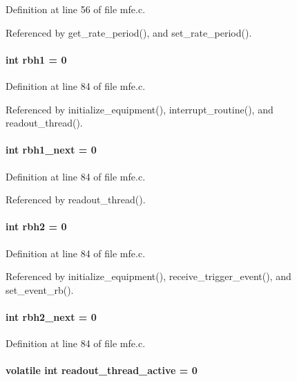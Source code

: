 Definition at line 56 of file mfe.c.

Referenced by get\_\-rate\_\-period(), and set\_\-rate\_\-period().
\paragraph[{rbh1}]{\setlength{\rightskip}{0pt plus 5cm}int {\bf rbh1} = 0}\hfill\label{mfe_8c_a1b7abb16c33dc41bd5c97aa08439568e}


Definition at line 84 of file mfe.c.

Referenced by initialize\_\-equipment(), interrupt\_\-routine(), and readout\_\-thread().
\paragraph[{rbh1\_\-next}]{\setlength{\rightskip}{0pt plus 5cm}int {\bf rbh1\_\-next} = 0}\hfill\label{mfe_8c_aec9294c38a73a78aa646600cef3e77f5}


Definition at line 84 of file mfe.c.

Referenced by readout\_\-thread().
\paragraph[{rbh2}]{\setlength{\rightskip}{0pt plus 5cm}int {\bf rbh2} = 0}\hfill\label{mfe_8c_a0cc81c4acd29047148a2b696a95b330c}


Definition at line 84 of file mfe.c.

Referenced by initialize\_\-equipment(), receive\_\-trigger\_\-event(), and set\_\-event\_\-rb().
\paragraph[{rbh2\_\-next}]{\setlength{\rightskip}{0pt plus 5cm}int {\bf rbh2\_\-next} = 0}\hfill\label{mfe_8c_a57f548429c75f48f83776762f94fd489}


Definition at line 84 of file mfe.c.
\paragraph[{readout\_\-thread\_\-active}]{\setlength{\rightskip}{0pt plus 5cm}volatile int {\bf readout\_\-thread\_\-active} = 0}\hfill\label{mfe_8c_a0e0b5bde115b046964736980402f114e}


